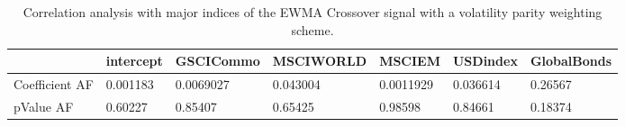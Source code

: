 \begin{table}[H]
\centering
\begin{tabular}{lllllll}
\hline& intercept & GSCICommo & MSCIWORLD & MSCIEM & USDindex & GlobalBonds \\ 
\hline 
Coefficient AF & 0.001183 & 0.0069027 & 0.043004 & 0.0011929 & 0.036614 & 0.26567 \\ 
pValue AF & 0.60227 & 0.85407 & 0.65425 & 0.98598 & 0.84661 & 0.18374 \\ 
\hline
\end{tabular}
\caption{Correlation analysis with major indices of the EWMA Crossover signal with a volatility parity weighting scheme.}
\label{MBBSVPNR_AFACTOR}
\end{table}